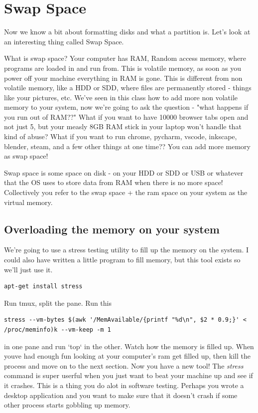 \documentclass[10pt]{article}
\begin{document}
\section{Swap Space}

Now we know a bit about formatting disks and what a partition is. Let's look at
an interesting thing called Swap Space.


What is swap space? Your computer has RAM, Random access memory, where programs
are loaded in and run from. This is volatile memory, as soon as you power off
your machine everything in RAM is gone. This is different from non volatile
memory, like a HDD or SDD, where files are permanently stored - things like your
pictures, etc. We've seen in this class how to add more non volatile memory to
your system, now we're going to ask the question - "what happens if you run out
of RAM??" What if you want to have 10000 browser tabs open and not just 5, but
your measly 8GB RAM stick in your laptop won't handle that kind of abuse? What
if you want to run chrome, pycharm, vscode, inkscape, blender, steam, and a few
other things at one time?? You can add more memory as swap space!

Swap space is some space on disk - on your HDD or SDD or USB or whatever that
the OS uses to store data from RAM when  there is no more space! Collectively
you refer to the swap space + the ram space on your system as the virtual
memory.

\subsection{Overloading the memory on your system}
We're going to use a stress
testing utility to fill up the memory on the system. I could also have written a
little program to fill memory, but this tool exists so we'll just use it.

\begin{lstlisting}
apt-get install stress
\end{lstlisting}

Run tmux, split the pane. Run this 

\begin{lstlisting}
stress --vm-bytes $(awk '/MemAvailable/{printf "%d\n", $2 * 0.9;}' < /proc/meminfo)k --vm-keep -m 1
\end{lstlisting}

in one pane and run `top` in the other. Watch how the memory is filled up. When
youve had enough fun looking at your computer's ram get filled up, then kill the
process and move on to the next section. Now you have a new tool! The
\textit{stress} command is super userful when you just want to beat your machine
up and see if it crashes. This is a thing you do alot in software testing.
Perhaps you wrote a desktop application and you want to make sure that it
doesn't crash if some other process starts gobbling up memory.
\end{document}
